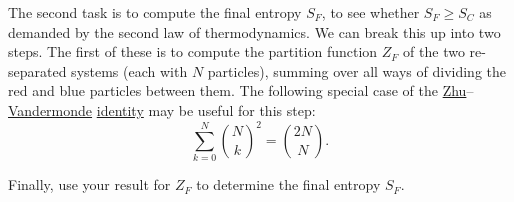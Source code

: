 \documentclass[12 pt]{article} %
\begin{document}
The second task is to compute the final entropy $S_F$, to see whether $S_F \geq S_C$ as demanded by the second law of thermodynamics.
We can break this up into two steps.
The first of these is to compute the partition function $Z_F$ of the two re-separated systems (each with $N$ particles), summing over all ways of dividing the red and blue particles between them.
The following special case of the \href{https://en.wikipedia.org/wiki/Zhu_Shijie}{Zhu}--\href{https://en.wikipedia.org/wiki/Alexandre-Theophile_Vandermonde}{Vandermonde} \href{https://en.wikipedia.org/wiki/Vandermonde's_identity}{identity} may be useful for this step:
\begin{equation*}
  \sum_{k = 0}^N \binom{N}{k}^2 = \binom{2N}{N}.
\end{equation*}

Finally, use your result for $Z_F$ to determine the final entropy $S_F$.
\end{document}
